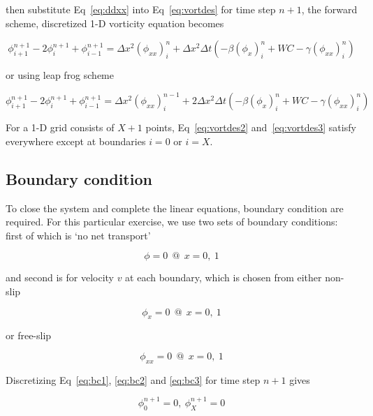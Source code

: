 \documentclass[12pt]{article}
\begin{document}
then substitute Eq~\ref{eq:ddxx} into Eq~\ref{eq:vortdes} for time step $n+1$, the forward scheme, discretized 1-D vorticity equation becomes

\begin{equation}
\phi_{i+1}^{n+1}-2\phi_i^{n+1}+\phi_{i-1}^{n+1} = \Delta x^2(\phi_{xx})_i^n + \Delta x^2\Delta t(-\beta(\phi_x)_i^n + WC - \gamma(\phi_{xx})_i^n)
\label{eq:vortdes2}
\end{equation}

or using leap frog scheme

\begin{equation}
\phi_{i+1}^{n+1}-2\phi_i^{n+1}+\phi_{i-1}^{n+1} = \Delta x^2(\phi_{xx})_i^{n-1} + 2\Delta x^2\Delta t(-\beta(\phi_x)_i^n + WC - \gamma(\phi_{xx})_i^n)
\label{eq:vortdes3}
\end{equation}

For a 1-D grid consists of $X+1$ points, Eq~\ref{eq:vortdes2} and~\ref{eq:vortdes3} satisfy everywhere except at boundaries $i=0$ or $i=X$.\\

\subsection{Boundary condition}
To close the system and complete the linear equations, boundary condition are required. For this particular exercise, we use two sets of boundary conditions: first of which is `no net transport'

\begin{equation}
\phi=0~~@~~x = 0,~1
\label{eq:bc1}
\end{equation}

and second is for velocity $v$ at each boundary, which is chosen from either non-slip

\begin{equation}
\phi_x=0~~@~~x = 0,~1
\label{eq:bc2}
\end{equation}

or free-slip

\begin{equation}
\phi_{xx}=0~~@~~x = 0,~1
\label{eq:bc3}
\end{equation}

Discretizing Eq~\ref{eq:bc1}, \ref{eq:bc2} and \ref{eq:bc3} for time step $n+1$ gives

\begin{equation}
\phi_0^{n+1}=0,~\phi_X^{n+1}=0
\label{eq:bcdes}
\end{equation}
\end{document}
